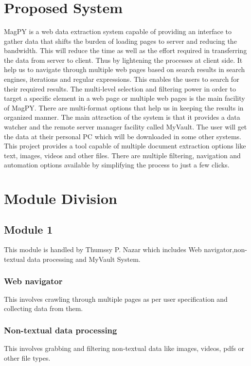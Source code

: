 \documentclass[a4paper]{report}
\begin{document}
\section{Proposed System}
\paragraph{}
\large\textnormal{MagPY is a web data extraction system capable of providing an interface to gather data that shifts the burden of loading pages to server and reducing the bandwidth. This will reduce the time as well as the effort required in transferring the data from server to client. Thus by lightening the processes at client side. It help us to navigate through multiple web pages based on search results in search engines, iterations and regular expressions. This enables the users to search for their required results. The multi-level selection and filtering power in order to target a specific element in a web page or multiple web pages is the main facility of MagPY. There are multi-format options that help us in keeping the results in organized manner. The main attraction of the system is that it provides a data watcher and the remote server manager facility called MyVault. The user will get the data at their personal PC which will be downloaded in some other systems. This project provides a tool capable of multiple document extraction options like text, images, videos and other files. There are multiple filtering, navigation and automation options available by simplifying the process to just a few clicks.}

\section{Module Division}
\subsection{Module 1}
\large\textnormal{This module is handled by Thumssy P. Nazar which includes Web navigator,non-textual data processing and MyVault System.}
\subsubsection{Web navigator}
\large\textnormal{This involves crawling through multiple pages as per user specification and collecting data from them.}
\subsubsection{Non-textual data processing}
\large\textnormal{This involves grabbing and filtering non-textual data like images, videos, pdfs or other file types.}
\end{document}
